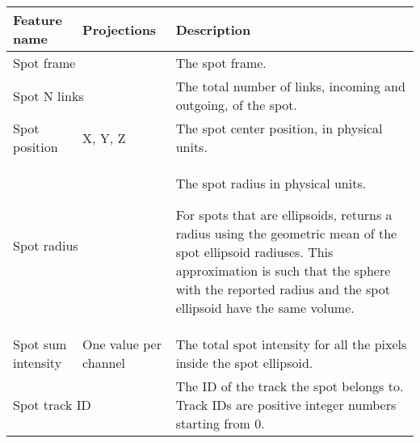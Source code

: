 {
\footnotesize

\begin{tabular}{p{}|p{}|p{}}

    \toprule
    \textbf{Feature name} &
    \textbf{Projections} &
    \textbf{Description}             
    \\ \midrule
    
    \multicolumn{2}{l|}{Spot frame} & 
    The spot frame.
    \\ \midrule

    \multicolumn{2}{l|}{Spot N links} & 
    The total number of links, incoming and outgoing, of the spot.
    \\ \midrule
    
    Spot position &
    X, Y, Z &
    The spot center position, in physical units.
    \\ \midrule
    
    \multicolumn{2}{l|}{Spot radius} & 
    The spot radius in physical units. 
    
    For spots that are ellipsoids, returns a radius using the geometric mean of the spot ellipsoid radiuses. This approximation is such that the sphere with the reported radius and the spot ellipsoid have the same volume.
    \\ \midrule
    
    Spot sum intensity & 
    One value per channel &
    The total spot intensity for all the pixels inside the spot ellipsoid.
    \\ \midrule
    
    \multicolumn{2}{l|}{Spot track ID} &
    The ID of the track the spot belongs to.
    Track IDs are positive integer numbers starting from 0.
    \\ \midrule

\end{tabular}
}